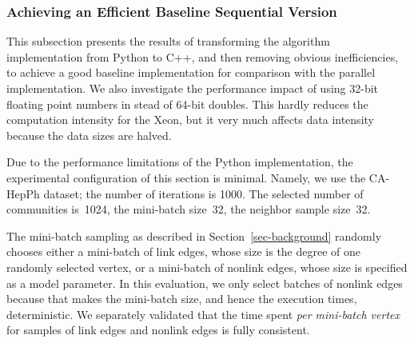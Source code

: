 \subsubsection{Achieving an Efficient Baseline Sequential Version}

This subsection presents the results of transforming the algorithm implementation
from Python to C++, and then removing obvious inefficiencies, to achieve a
good baseline implementation for comparison with the parallel implementation.
%
We also investigate the performance impact of using
32-bit floating point numbers in stead of 64-bit doubles.
This hardly reduces the computation intensity for the Xeon, but it very much
affects data intensity because the data sizes are halved.
%

Due to the performance limitations of the Python implementation, the
experimental configuration of this section is minimal.
%
Namely, we use the CA-HepPh dataset; the number of
iterations is 1000.
The selected number of communities is~1024, the mini-batch size~32, the
neighbor sample size~32.

The mini-batch sampling as described in Section~\ref{sec-background} randomly
chooses either a mini-batch of link edges, whose size is the degree of one
randomly selected vertex, or a mini-batch of nonlink edges, whose size is
specified as a model parameter. In this evaluation, we only select batches
of nonlink edges because that makes the mini-batch size, and hence the
execution times, deterministic. We separately validated that the time spent
\textit{per mini-batch vertex} for samples of link edges and nonlink edges
is fully consistent.

